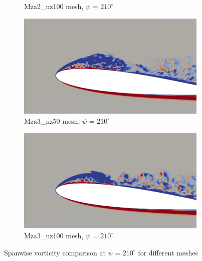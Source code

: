 \begin{figure}[H]
\begin{subfigure}[b]{0.475\textwidth}
		\caption{Mza2\_nz100 mesh, $\psi$ = $210^\circ$}
		\label{fig:Mza2_100_sp_psi210}
	\end{subfigure}
	\begin{subfigure}[b]{0.475\textwidth}
	\centering
	\includegraphics[width=1\textwidth]{figures/zonal_adapt_results/vorticity_plots/v2/Mza3_50/spavg/phase_210.png}
	\caption{Mza3\_nz50 mesh, $\psi$ = $210^\circ$}
	\label{fig:Mza3_50_sp_psi210}
\end{subfigure}
	\begin{subfigure}[b]{0.475\textwidth}
		\centering
		\includegraphics[width=1\textwidth]{figures/zonal_adapt_results/vorticity_plots/v2/Mza3_100/spavg/phase_210.png}
		\caption{Mza3\_nz100 mesh, $\psi$ = $210^\circ$}
		\label{fig:Mza3_100_sp_psi210}
	\end{subfigure}
	\caption{Spanwise vorticity comparison at $\psi$ = $210^\circ$ for different meshes}
	\label{fig:vorticity_zonal_210}
\end{figure}



